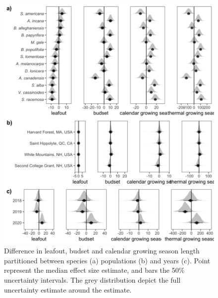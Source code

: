 \documentclass{article}[12pt]
\begin{document}
{%
\begin{figure}[h!]
    \centering
 \includegraphics[width=.7\textwidth]{..//analyses/figures/var_parts.jpeg}
    \caption{Difference in leafout, budset and calendar growing season length partitioned between species (a) populations (b) and years (c). Point represent the median effect size estimate, and bars the 50\% uncertainty intervals. The grey distribution depict the full uncertainty estimate around the estimate.}
    \label{fig:vapar}
\end{figure}

}
\end{document}
